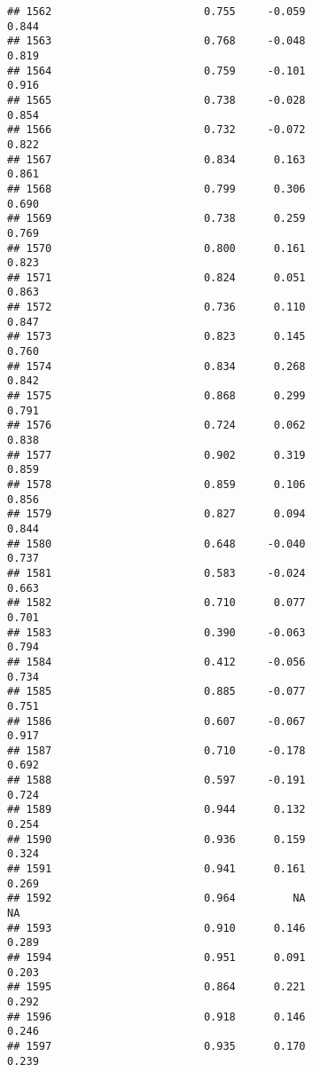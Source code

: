 \documentclass[
]{article}
\begin{document}
\begin{verbatim}
## 1562                        0.755     -0.059                     0.844
## 1563                        0.768     -0.048                     0.819
## 1564                        0.759     -0.101                     0.916
## 1565                        0.738     -0.028                     0.854
## 1566                        0.732     -0.072                     0.822
## 1567                        0.834      0.163                     0.861
## 1568                        0.799      0.306                     0.690
## 1569                        0.738      0.259                     0.769
## 1570                        0.800      0.161                     0.823
## 1571                        0.824      0.051                     0.863
## 1572                        0.736      0.110                     0.847
## 1573                        0.823      0.145                     0.760
## 1574                        0.834      0.268                     0.842
## 1575                        0.868      0.299                     0.791
## 1576                        0.724      0.062                     0.838
## 1577                        0.902      0.319                     0.859
## 1578                        0.859      0.106                     0.856
## 1579                        0.827      0.094                     0.844
## 1580                        0.648     -0.040                     0.737
## 1581                        0.583     -0.024                     0.663
## 1582                        0.710      0.077                     0.701
## 1583                        0.390     -0.063                     0.794
## 1584                        0.412     -0.056                     0.734
## 1585                        0.885     -0.077                     0.751
## 1586                        0.607     -0.067                     0.917
## 1587                        0.710     -0.178                     0.692
## 1588                        0.597     -0.191                     0.724
## 1589                        0.944      0.132                     0.254
## 1590                        0.936      0.159                     0.324
## 1591                        0.941      0.161                     0.269
## 1592                        0.964         NA                        NA
## 1593                        0.910      0.146                     0.289
## 1594                        0.951      0.091                     0.203
## 1595                        0.864      0.221                     0.292
## 1596                        0.918      0.146                     0.246
## 1597                        0.935      0.170                     0.239

\end{verbatim}
\end{document}
